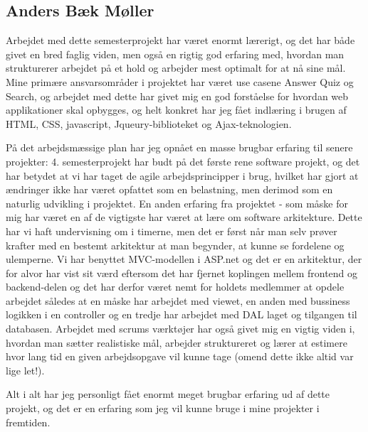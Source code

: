 \subsection*{Anders Bæk Møller}


Arbejdet med dette semesterprojekt har været enormt lærerigt, og det har både givet en bred faglig viden, men også en rigtig god erfaring med, hvordan man strukturerer arbejdet på et hold og arbejder mest optimalt for at nå sine mål. Mine primære ansvarsområder i projektet har været use casene Answer Quiz og Search, og arbejdet med dette har givet mig en god forståelse for hvordan web applikationer skal opbygges, og helt konkret har jeg fået indlæring i brugen af HTML, CSS, javascript, Jqueury-biblioteket og Ajax-teknologien. 

På det arbejdsmæssige plan har jeg opnået en masse brugbar erfaring til senere projekter: 4. semesterprojekt har budt på det første rene software projekt, og det har betydet at vi har taget de agile arbejdsprincipper i brug, hvilket har gjort at ændringer ikke har været opfattet som en belastning, men derimod som en naturlig udvikling i projektet. En anden erfaring fra projektet - som måske for mig har været en af de vigtigste har været at lære om software arkitekture. Dette har vi haft undervisning om i timerne, men det er først når man selv prøver krafter med en bestemt arkitektur at man begynder, at kunne se fordelene og ulemperne. Vi har benyttet MVC-modellen i ASP.net og det er en arkitektur, der for alvor har vist sit værd eftersom det har fjernet koplingen mellem frontend og backend-delen og det har derfor været nemt for holdets medlemmer at opdele arbejdet således at en måske har arbejdet med viewet, en anden med bussiness logikken i en controller og en tredje har arbejdet med DAL laget og tilgangen til databasen.
Arbejdet med scrums værktøjer har også givet mig en vigtig viden i, hvordan man sætter realistiske mål, arbejder struktureret og lærer at estimere hvor lang tid en given arbejdsopgave vil kunne tage (omend dette ikke altid var lige let!).


Alt i alt har jeg personligt fået enormt meget brugbar erfaring ud af dette projekt, og det er en erfaring som jeg vil kunne bruge i mine projekter i fremtiden.
